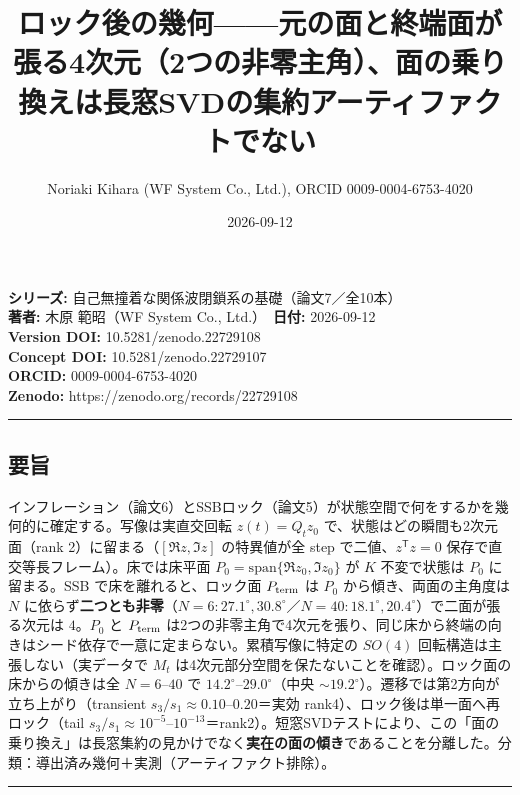 \documentclass[
  a4paper,
]{ltjsarticle}
\title{ロック後の幾何------元の面と終端面が張る4次元（2つの非零主角）、面の乗り換えは長窓SVDの集約アーティファクトでない}
\author{Noriaki Kihara (WF System Co., Ltd.), ORCID 0009-0004-6753-4020}
\date{2026-09-12}
\begin{document}
\maketitle

\textbf{シリーズ:} 自己無撞着な関係波閉鎖系の基礎（論文7／全10本）\\
\textbf{著者:} 木原 範昭（WF System Co., Ltd.）　\textbf{日付:}
2026-09-12\\
\textbf{Version DOI:} 10.5281/zenodo.22729108\\
\textbf{Concept DOI:} 10.5281/zenodo.22729107\\
\textbf{ORCID:} 0009-0004-6753-4020\\
\textbf{Zenodo:} https://zenodo.org/records/22729108\\

\begin{center}\rule{0.5\linewidth}{0.5pt}\end{center}

\subsection{要旨}\label{ux8981ux65e8}

インフレーション（論文6）とSSBロック（論文5）が状態空間で何をするかを幾何的に確定する。写像は実直交回転
\(z(t)=Q_t z_0\) で、状態はどの瞬間も2次元面（rank
2）に留まる（\([\Re z,\Im z]\) の特異値が全 step
で二値、\(z^{\mathsf T}z=0\) 保存で直交等長フレーム）。床では床平面
\(P_0=\mathrm{span}\{\Re z_0,\Im z_0\}\) が \(K\) 不変で状態は \(P_0\)
に留まる。SSB で床を離れると、ロック面 \(P_{\rm term}\) は \(P_0\)
から傾き、両面の主角度は \(N\)
に依らず\textbf{二つとも非零}（\(N=6{:}27.1^\circ,30.8^\circ\)／\(N=40{:}18.1^\circ,20.4^\circ\)）で二面が張る次元は
\(4\)。\(P_0\) と \(P_{\rm term}\)
は2つの非零主角で4次元を張り、同じ床から終端の向きはシード依存で一意に定まらない。累積写像に特定の
\(SO(4)\) 回転構造は主張しない（実データで \(M_t\)
は4次元部分空間を保たないことを確認）。ロック面の床からの傾きは全
\(N=6\)--\(40\) で \(14.2^\circ\)--\(29.0^\circ\)（中央
\(\sim19.2^\circ\)）。遷移では第2方向が立ち上がり（transient
\(s_3/s_1\approx0.10\)--\(0.20\)＝実効
rank4）、ロック後は単一面へ再ロック（tail
\(s_3/s_1\approx10^{-5}\)--\(10^{-13}\)＝rank2）。短窓SVDテストにより、この「面の乗り換え」は長窓集約の見かけでなく\textbf{実在の面の傾き}であることを分離した。分類：導出済み幾何＋実測（アーティファクト排除）。

\begin{center}\rule{0.5\linewidth}{0.5pt}\end{center}
\end{document}
